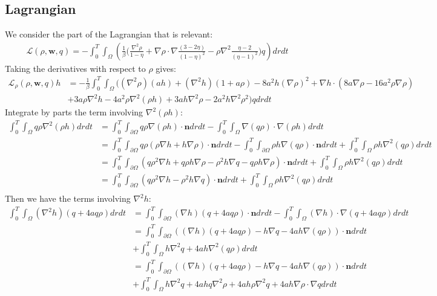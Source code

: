 \documentclass[11pt, a4paper]{article}
\theoremstyle{definition}
\newcommand{\w}{\mathbf{w}}
\newcommand{\n}{\mathbf{n}}
\begin{document}
\subsection{Lagrangian}
We consider the part of the Lagrangian that is relevant:
\begin{align*}
\mathcal{L}(\rho, \w, q) = - \int_0^T \int_\Omega \left(\frac{1}{\beta} \bigg( \frac{\nabla^2 \rho}{1 - \eta} +  \nabla \rho \cdot \nabla \frac{(3- 2 \eta)}{(1 - \eta)^2}  - \rho \nabla^2\frac{\eta - 2}{(\eta - 1)^2} \bigg) q \right) dr dt
\end{align*}
Taking the derivatives with respect to $\rho$ gives:
\begin{align*}
\mathcal{L}_\rho(\rho, \w, q) h &= -\frac{1}{\beta}  \int_0^T \int_\Omega \bigg( (\nabla^2 \rho) ( a h ) + (\nabla^2 h )(1 + a \rho) - 8a^2 h \left(\nabla \rho\right)^2   + \nabla h \cdot \left( 8a \nabla \rho - 16 a^2 \rho \nabla \rho  \right) \\
&+ 3a \rho \nabla ^2 h - 4a^2 \rho \nabla^2(\rho h) + 3ah \nabla^2 \rho - 2a^2 h \nabla^2 \rho^2 \bigg) q dr dt
\end{align*}
Integrate by parts the term involving $\nabla^2 (\rho h)$:
\begin{align*}
\int_0^T \int_\Omega q \rho \nabla^2(\rho h) dr dt &= \int_0^T \int_{\partial \Omega} q\rho \nabla(\rho h)\cdot \n dr dt - \int_0^T \int_\Omega \nabla (q \rho) \cdot \nabla (\rho h) dr dt\\
&= \int_0^T \int_{\partial \Omega} q \rho \left(\rho \nabla h + h \nabla \rho \right) \cdot \n dr dt - \int_0^T \int_{\partial \Omega} \rho h \nabla (q\rho) \cdot \n dr dt +
\int_0^T \int_\Omega \rho h \nabla^2 (q\rho)  dr dt\\
&= \int_0^T \int_{\partial \Omega} \left(q \rho^2 \nabla h + q \rho h \nabla \rho  -  \rho^2 h \nabla q - q \rho h \nabla \rho \right)\cdot \n dr dt +
\int_0^T \int_\Omega \rho h \nabla^2 (q\rho)  dr dt\\
&= \int_0^T \int_{\partial \Omega} \left(q \rho^2 \nabla h   -  \rho^2 h \nabla q  \right)\cdot \n dr dt +
\int_0^T \int_\Omega \rho h \nabla^2 (q\rho)  dr dt\\
\end{align*}
Then we have the terms involving $\nabla^2 h$:
\begin{align*}
\int_0^T \int_\Omega  (\nabla^2 h) (q + 4 a q \rho )  dr dt &= \int_0^T \int_{\partial \Omega}(\nabla h) (q + 4 a q \rho ) \cdot \n dr dt - \int_0^T \int_\Omega (\nabla h) \cdot \nabla (q + 4 a q \rho )dr dt\\
&= \int_0^T \int_{\partial \Omega} \left((\nabla h) (q + 4 a q \rho ) -  h \nabla q -4 ah \nabla (q \rho ) \right) \cdot \n  dr dt \\
&+ \int_0^T \int_\Omega  h\nabla^2 q + 4 a h \nabla^2(q \rho ) dr dt\\
&= \int_0^T \int_{\partial \Omega} \left((\nabla h) (q + 4 a q \rho ) -  h \nabla q - 4 ah \nabla (q \rho ) \right) \cdot \n  dr dt \\
&+ \int_0^T \int_\Omega  h\nabla^2 q + 4 a h q \nabla^2 \rho + 4 a h  \rho \nabla^2 q + 4 a h \nabla \rho \cdot \nabla q dr dt
\end{align*}
\end{document}

